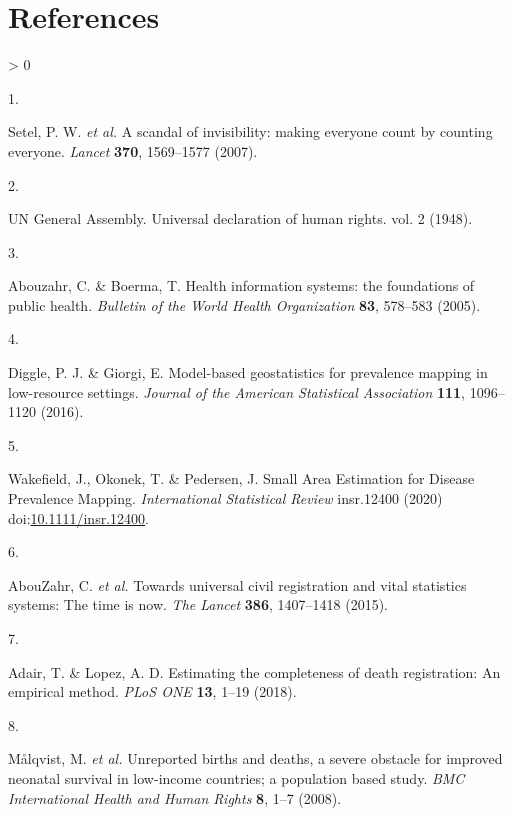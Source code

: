 \documentclass[
]{article}
\newlength{\cslhangindent}
\newlength{\csllabelwidth}
\newenvironment{CSLReferences}[2] %
 {%
  \setlength{\parindent}{0pt}
  \ifodd #1 \everypar{\setlength{\hangindent}{\cslhangindent}}\ignorespaces\fi
  \ifnum #2 > 0
  \setlength{\parskip}{#2\baselineskip}
  \fi
 }%
 {}
\newcommand{\CSLLeftMargin}[1]{\parbox[t]{\csllabelwidth}{#1}}
\newcommand{\CSLRightInline}[1]{\parbox[t]{\linewidth - \csllabelwidth}{#1}\break}
\begin{document}
\hypertarget{references}{%
\section{References}\label{references}}

\hypertarget{refs}{}
\begin{CSLReferences}{0}{0}
\leavevmode\hypertarget{ref-Setel2007}{}%
\CSLLeftMargin{1. }
\CSLRightInline{Setel, P. W. \emph{et al.} {A scandal of invisibility: making everyone count by counting everyone}. \emph{Lancet} \textbf{370}, 1569--1577 (2007).}

\leavevmode\hypertarget{ref-srs}{}%
\CSLLeftMargin{2. }
\CSLRightInline{UN General Assembly. {Universal declaration of human rights}. vol. 2 (1948).}

\leavevmode\hypertarget{ref-Abouzahr2005}{}%
\CSLLeftMargin{3. }
\CSLRightInline{Abouzahr, C. \& Boerma, T. {Health information systems: the foundations of public health}. \emph{Bulletin of the World Health Organization} \textbf{83}, 578--583 (2005).}

\leavevmode\hypertarget{ref-Diggle2016}{}%
\CSLLeftMargin{4. }
\CSLRightInline{Diggle, P. J. \& Giorgi, E. {Model-based geostatistics for prevalence mapping in low-resource settings}. \emph{Journal of the American Statistical Association} \textbf{111}, 1096--1120 (2016).}

\leavevmode\hypertarget{ref-Wakefield2020}{}%
\CSLLeftMargin{5. }
\CSLRightInline{Wakefield, J., Okonek, T. \& Pedersen, J. {Small Area Estimation for Disease Prevalence Mapping}. \emph{International Statistical Review} insr.12400 (2020) doi:\href{https://doi.org/10.1111/insr.12400}{10.1111/insr.12400}.}

\leavevmode\hypertarget{ref-AbouZahr2015}{}%
\CSLLeftMargin{6. }
\CSLRightInline{AbouZahr, C. \emph{et al.} {Towards universal civil registration and vital statistics systems: The time is now}. \emph{The Lancet} \textbf{386}, 1407--1418 (2015).}

\leavevmode\hypertarget{ref-Adair2018}{}%
\CSLLeftMargin{7. }
\CSLRightInline{Adair, T. \& Lopez, A. D. {Estimating the completeness of death registration: An empirical method}. \emph{PLoS ONE} \textbf{13}, 1--19 (2018).}

\leavevmode\hypertarget{ref-Malqvist2008}{}%
\CSLLeftMargin{8. }
\CSLRightInline{Målqvist, M. \emph{et al.} {Unreported births and deaths, a severe obstacle for improved neonatal survival in low-income countries; a population based study}. \emph{BMC International Health and Human Rights} \textbf{8}, 1--7 (2008).}


\end{CSLReferences}
\end{document}
